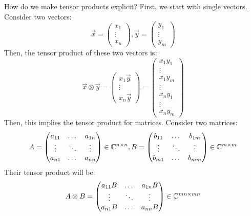 How do we make tensor products explicit? First, we start with single vectors. Consider two vectors:
$$\vec{x} = \begin{pmatrix}
    x_1 \\
    \vdots \\
    x_n
\end{pmatrix}, \vec{y} = \begin{pmatrix}
    y_1 \\
    \vdots \\
    y_m
\end{pmatrix}$$
Then, the tensor product of these two vectors is:
$$\vec{x} \otimes \vec{y} = \begin{pmatrix}
    x_1 \vec{y} \\
    \vdots \\
    x_n \vec{y}
\end{pmatrix} = \begin{pmatrix}
    x_1 y_1 \\
    \vdots \\
    x_1 y_m \\
    \vdots \\
    x_n y_1 \\
    \vdots \\
    x_n y_m
\end{pmatrix}$$
Then, this implies the tensor product for matrices. Consider two matrices:
$$A = \begin{pmatrix}
    a_{11} & \dots & a_{1n} \\
    \vdots & \ddots & \vdots \\
    a_{n1} & \dots & a_{nn}
\end{pmatrix} \in \mathbb{C}^{n \times n}, B = \begin{pmatrix}
    b_{11} & \dots & b_{1m} \\
    \vdots & \ddots & \vdots \\
    b_{m1} & \dots & b_{mm}
\end{pmatrix} \in \mathbb{C}^{m \times m}$$
Their tensor product will be:
$$A \otimes B = \begin{pmatrix}
    a_{11} B & \dots & a_{1n} B \\
    \vdots & \ddots & \vdots \\
    a_{n1} B & \dots & a_{nn} B
\end{pmatrix} \in \mathbb{C}^{mn \times mn}$$

